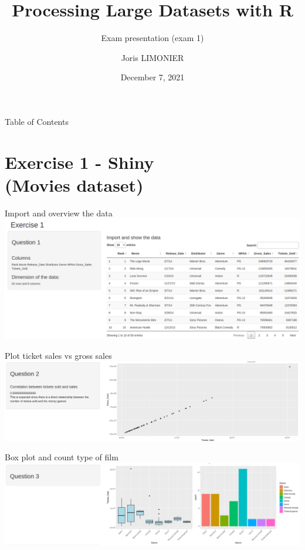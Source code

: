 \documentclass{beamer}
\title{Processing Large Datasets with R}
\subtitle{Exam presentation (exam 1)}
\author{\large Joris LIMONIER}
\date{December 7, 2021}
\begin{document}

\maketitle

\begin{frame}{Table of Contents}
    \tableofcontents
\end{frame}

\section{Exercise 1 - Shiny\\(Movies dataset)}

\begin{frame}{Import and overview the data}
    \includegraphics[width=\textwidth]{img/ex1_q1.png}
\end{frame}

\begin{frame}{Plot ticket sales vs gross sales}
    \includegraphics[width=\textwidth]{img/ex1_q2.png}
\end{frame}

\begin{frame}{Box plot and count type of film}
    \includegraphics[width=\textwidth]{img/ex1_q3.png}
\end{frame}
\end{document}
